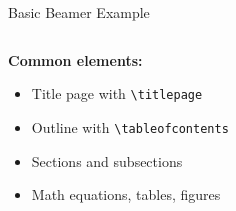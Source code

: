 \begin{frame}[fragile]{Basic Beamer Example}
\begin{columns}
\begin{column}{0.5\textwidth}
              \textbf{Common elements:}
              \begin{itemize}
                   \item Title page with \texttt{\textbackslash titlepage}
                   \item Outline with \texttt{\textbackslash tableofcontents}
                   \item Sections and subsections
                   \item Math equations, tables, figures
              \end{itemize}
              
              
         \end{column}
    \end{columns}
\end{frame}
               